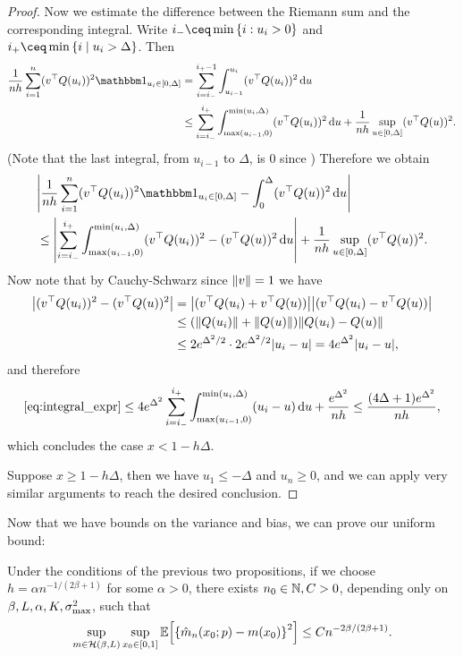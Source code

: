 \begin{proof}
Now we estimate the difference between the Riemann sum and the corresponding integral. Write $i_- \ceq \min\qty{i : u_i > 0}$ and $i_+ \ceq \min\qty{i \mid u_i > \Delta}$.  Then 
\begin{align*}
\frac1{nh} \sum_{i=1}^n (v\T Q(u_i))^2 \ind_{u_i \in [0, \Delta]} &= \sum_{i=i_-}^{i_+ -1 } \int_{u_{i-1}}^{u_i} (v\T Q(u_i))^2 \dd{u} \\
&\leq \sum_{i = i_-}^{i_+} \int_{\max(u_{i-1}, 0)}^{\min(u_i, \Delta)} (v\T Q(u_i))^2 \dd{u} + \frac1{nh} \sup_{u \in [0, \Delta]} (v\T Q(u))^2.
\end{align*}
(Note that the last integral, from $u_{i-1}$ to $\Delta$, is 0 since )
Therefore we obtain
\begin{align}
	&\abs{\frac{1}{nh} \sum_{i=1}^n (v\T Q(u_i))^2 \ind_{u_i \in [0, \Delta]} -  \int_0^\Delta (v\T Q(u))^2 \dd{u}} \nonumber \\
	&\leq \abs{\sum_{i = i_-}^{i_+} \int_{\max(u_{i-1}, 0)}^{\min(u_i, \Delta)}(v\T Q(u_i))^2 - (v\T Q(u))^2 \dd{u}} + \frac1{nh} \sup_{u \in [0, \Delta]} (v\T Q(u))^2. \label{eq:integral_expr}
\end{align}
Now note that by Cauchy-Schwarz since $\norm{v} = 1$ we have 
\begin{align*}
\abs{(v^\top Q(u_i))^2 - (v^\top Q(u))^2} &= \abs{(v^\top Q(u_i) + v^\top Q(u))}\abs{(v^\top Q(u_i) - v^\top Q(u))}\\
&\leq (\norm{Q(u_i)} + \norm{Q(u)}) \norm{Q(u_i) - Q(u)} \\
&\leq 2 e^{\Delta^2/2} \cdot 2e^{\Delta^2/2} \abs{u_i - u} = 4 e^{\Delta^2} \abs{u_i - u}, 
\end{align*}
and  therefore
\[
\eqref{eq:integral_expr} \leq 4e^{\Delta^2} \sum_{i=i_-}^{i_+} \int_{\max(u_{i-1}, 0)}^{\min(u_i, \Delta)}(u_i - u) \dd{u} + \frac{e^{\Delta^2}}{nh} \leq \frac{(4\Delta + 1) e^{\Delta^2}}{nh},
\]
which concludes the case $x < 1- h\Delta$. 

Suppose $x \geq 1 - h\Delta$, then we have $u_1 \leq -\Delta$ and $u_n \geq 0$, and we can apply very similar arguments to reach the desired conclusion. 
\end{proof}

Now that we have bounds on the variance and bias, we can prove our uniform bound: 
\begin{theorem}
	Under the conditions of the previous two propositions, if we choose $h = \alpha n^{-1/(2\beta + 1)}$ for some $\alpha > 0$, there exists $n_0 \in \mathbb N, C > 0$, depending only on $\beta, L, \alpha, K, \sigma_\mathrm{max}^2$, such that
	\[
	\sup_{m \in \mathcal H(\beta, L)} \sup_{x_0 \in [0, 1]} \mathbb E\qty[ \qty{\hat m_n(x_0;p) - m(x_0)}^2] \leq Cn^{-2\beta/(2\beta + 1)}.
	\]
\end{theorem}


